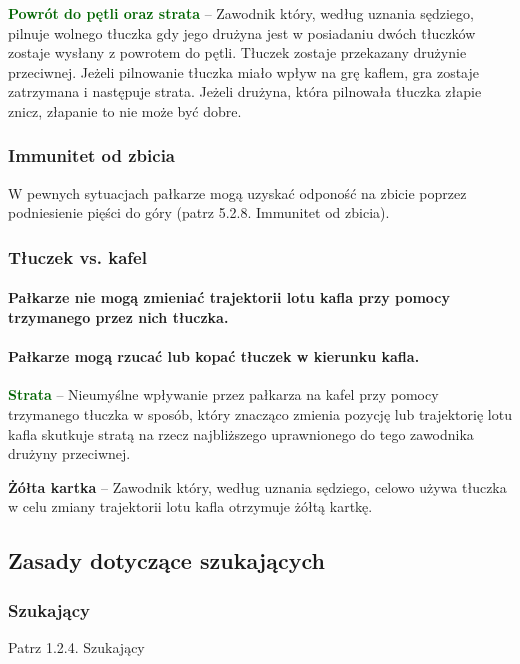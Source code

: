 \documentclass[12pt]{article}
\newcommand\yellowcard[1]{\bgroup\textcolor{darkyellow}{\textbf{#1}}}
\newcommand\other[1]{\bgroup\textcolor{darkgreen}{\textbf{#1}}}
\begin{document}
\other{Powrót do pętli oraz strata} -- Zawodnik który, według uznania
sędziego, pilnuje wolnego tłuczka gdy jego drużyna jest w posiadaniu
dwóch tłuczków zostaje wysłany z powrotem do pętli. Tłuczek zostaje
przekazany drużynie przeciwnej. Jeżeli pilnowanie tłuczka miało wpływ na
grę kaflem, gra zostaje zatrzymana i następuje strata. Jeżeli drużyna,
która pilnowała tłuczka złapie znicz, złapanie to nie może być dobre.

\subsubsection{Immunitet od zbicia}

W pewnych sytuacjach pałkarze mogą uzyskać odponość na zbicie poprzez
podniesienie pięści do góry (patrz 5.2.8. Immunitet od zbicia).

\subsubsection{Tłuczek vs. kafel}

\paragraph{Pałkarze nie mogą zmieniać trajektorii lotu kafla przy
	pomocy trzymanego przez nich tłuczka.}

\paragraph{Pałkarze mogą rzucać lub kopać tłuczek w kierunku
	kafla.}

\other{Strata} -- Nieumyślne wpływanie przez pałkarza na kafel przy pomocy
trzymanego tłuczka w sposób, który znacząco zmienia pozycję lub
trajektorię lotu kafla skutkuje stratą na rzecz najbliższego
uprawnionego do tego zawodnika drużyny przeciwnej.

\yellowcard{Żółta kartka} -- Zawodnik który, według uznania sędziego, celowo
używa tłuczka w celu zmiany trajektorii lotu kafla otrzymuje żółtą
kartkę.

\subsection{Zasady dotyczące szukających}

\subsubsection{Szukający}
Patrz 1.2.4. Szukający
\end{document}
